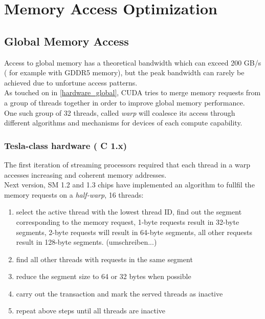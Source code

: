 \section{Memory Access Optimization}
\label{sec:access}
\subsection{Global Memory Access}
\label{global_access}
Access to global memory has a theoretical bandwidth which can exceed 200 GB/s ( for example with GDDR5 memory), but the peak bandwidth can rarely be achieved due to unfortune access patterns.\\
As touched on in \ref{hardware_global}, CUDA tries to merge memory requests from a group of threads together in order to improve global memory performance.\\
One such group of 32 threads, called \emph{warp} will coalesce its access through different algorithms and mechanisms for devices of each compute capability.\\
\subsubsection{Tesla-class hardware ( C 1.x)}
The first iteration of streaming processors required that each thread in a warp accesses increasing and coherent memory addresses.\\ 
Next version, SM 1.2 and 1.3 chips have implemented an algorithm to fullfil the memory requests on a \emph{half-warp}, 16 threads:\\
\begin{enumerate}
    \item select the active thread with the lowest thread ID, find out the segment corresponding to the memory request, 1-byte requests result in 32-byte segments, 2-byte requests will result in 64-byte segments, all other requests result in 128-byte segments. (umschreiben...)
    \item find all other threads with requests in the same segment
    \item reduce the segment size to 64 or 32 bytes when possible
    \item carry out the transaction and mark the served threads as inactive
    \item repeat above steps until all threads are inactive
\end{enumerate}
